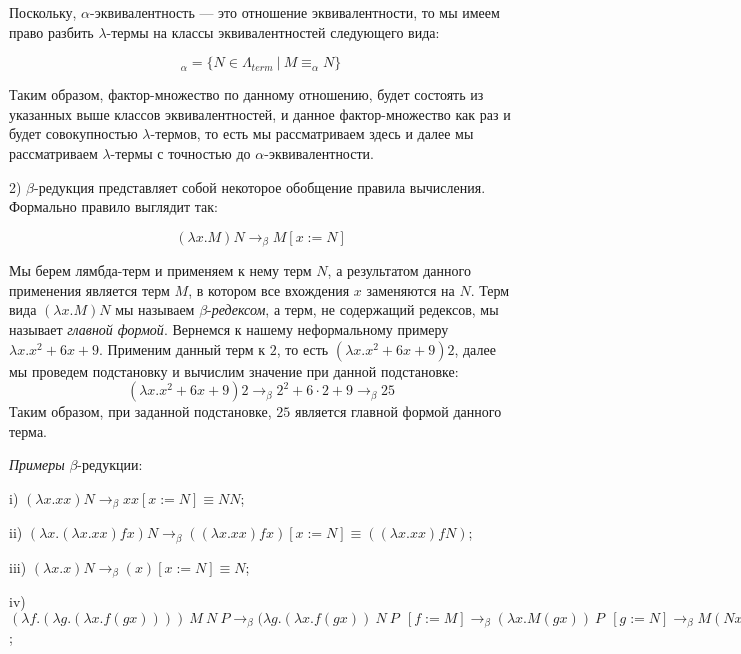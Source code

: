 \documentclass[a4paper]{article}
\begin{document}
Поскольку, $\alpha$-эквивалентность --- это отношение эквивалентности, то мы имеем право разбить $\lambda$-термы на классы эквивалентностей следующего вида:

\begin{equation}
[M]_{\alpha} = \{ N \in \Lambda_{term} \: | \: M \equiv_{\alpha} N \}
\end{equation}

Таким образом, фактор-множество по данному отношению, будет состоять из указанных выше классов эквивалентностей, и данное фактор-множество как
раз и будет совокупностью $\lambda$-термов, то есть мы рассматриваем здесь и далее мы рассматриваем $\lambda$-термы с точностью до $\alpha$-эквивалентности.

2) $\beta$-редукция представляет собой некоторое обобщение правила вычисления. Формально правило выглядит так:

\begin{equation}
(\lambda x. M) N \rightarrow_{\beta} M[x := N]
\end{equation}

Мы берем лямбда-терм и применяем к нему терм $N$, а результатом данного применения является терм $M$, в котором все вхождения $x$ заменяются на $N$.
Терм вида $(\lambda x. M) N$ мы называем $\beta$-\emph{редексом}, а терм, не содержащий редексов, мы называет \emph{главной формой}.
Вернемся к нашему неформальному примеру $\lambda x.x^2 + 6x + 9$. Применим данный терм к $2$, то есть $(\lambda x.x^2 + 6x + 9) 2$, далее мы проведем подстановку и вычислим значение
при данной подстановке:
\begin{equation}
(\lambda x.x^2 + 6x + 9) 2 \rightarrow_{\beta} 2^2 + 6 \cdot 2 + 9 \rightarrow_{\beta} 25
\end{equation}
Таким образом, при заданной подстановке, $25$ является главной формой данного терма.

\emph{Примеры} $\beta$-редукции:

i) $(\lambda x. x x)N \rightarrow_{\beta} x x [x := N] \equiv N N$;

ii) $(\lambda x. (\lambda x. x x) f x)N \rightarrow_{\beta} ((\lambda x. x x) f x) [x := N] \equiv ((\lambda x. xx) f N)$;

iii) $(\lambda x.x) N \rightarrow_{\beta} (x) [x := N] \equiv N$;

iv) $(\lambda f. (\lambda g. (\lambda x. f (g x)))) \: M \: N \: P \rightarrow_{\beta} (\lambda g. (\lambda x. f (g x)) \: N \: P \:\: [f := M] \rightarrow_{\beta} (\lambda x. M (g x)) \: P \:\: [g := N] \rightarrow_{\beta} M (N x) [x := P] \equiv M (N P)$;
\end{document}

